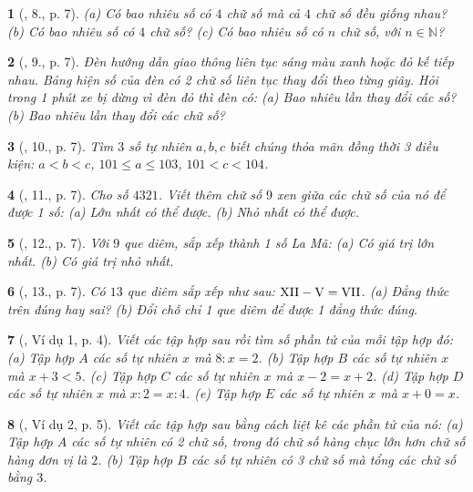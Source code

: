 \documentclass{article}
\newtheorem{baitoan}{}
\begin{document}
\begin{baitoan}[\cite{Tuyen_Toan_6}, 8., p. 7]
	(a) Có bao nhiêu số có $4$ chữ số mà cả $4$ chữ số đều giống nhau? (b) Có bao nhiêu số có $4$ chữ số? (c) Có bao nhiêu số có $n$ chữ số, với $n\in\mathbb{N}$?
\end{baitoan}

\begin{baitoan}[\cite{Tuyen_Toan_6}, 9., p. 7]
	Đèn hướng dẫn giao thông liên tục sáng màu xanh hoặc đỏ kế tiếp nhau. Bảng hiện số của đèn có 2 chữ số liên tục thay đổi theo từng giây. Hỏi trong 1 phút xe bị dừng vì đèn đỏ thì đèn có: (a) Bao nhiêu lần thay đổi các số? (b) Bao nhiêu lần thay đổi các chữ số?
\end{baitoan}

\begin{baitoan}[\cite{Tuyen_Toan_6}, 10., p. 7]
	Tìm $3$ số tự nhiên $a,b,c$ biết chúng thỏa mãn đồng thời 3 điều kiện: $a < b < c$, $101\le a\le103$, $101 < c < 104$.
\end{baitoan}

\begin{baitoan}[\cite{Tuyen_Toan_6}, 11., p. 7]
	Cho số $4321$. Viết thêm chữ số $9$ xen giữa các chữ số của nó để được 1 số: (a) Lớn nhất có thể được. (b) Nhỏ nhất có thể được.
\end{baitoan}

\begin{baitoan}[\cite{Tuyen_Toan_6}, 12., p. 7]
	Với $9$ que diêm, sắp xếp thành 1 số La Mã: (a) Có giá trị lớn nhất. (b) Có giá trị nhỏ nhất.
\end{baitoan}

\begin{baitoan}[\cite{Tuyen_Toan_6}, 13., p. 7]
	Có $13$ que diêm sắp xếp như sau: $\rm XII - V = VII$. (a) Đẳng thức trên đúng hay sai? (b) Đổi chỗ chỉ 1 que diêm để được 1 đẳng thức đúng.
\end{baitoan}

\begin{baitoan}[\cite{Binh_Toan_6_tap_1}, Ví dụ 1, p. 4]
	Viết các tập hợp sau rồi tìm số phần tử của mỗi tập hợp đó: (a) Tập hợp $A$ các số tự nhiên $x$ mà $8:x = 2$. (b) Tập hợp $B$ các số tự nhiên $x$ mà $x + 3 < 5$. (c) Tập hợp $C$ các số tự nhiên $x$ mà $x - 2 = x + 2$. (d) Tập hợp $D$ các số tự nhiên $x$ mà $x:2 = x:4$. (e) Tập hợp $E$ các số tự nhiên $x$ mà $x + 0 = x$.
\end{baitoan}

\begin{baitoan}[\cite{Binh_Toan_6_tap_1}, Ví dụ 2, p. 5]
	Viết các tập hợp sau bằng cách liệt kê các phần tử của nó: (a) Tập hợp $A$ các số tự nhiên có 2 chữ số, trong đó chữ số hàng chục lớn hơn chữ số hàng đơn vị là $2$. (b) Tập hợp $B$ các số tự nhiên có 3 chữ số mà tổng các chữ số bằng $3$.
\end{baitoan}
\end{document}
